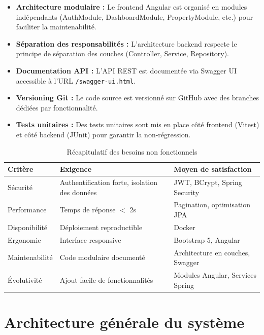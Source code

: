 \documentclass[a4paper,12pt]{report}
\begin{document}
\begin{itemize}
    \item \textbf{Architecture modulaire :} Le frontend Angular est organisé en modules indépendants (AuthModule, DashboardModule, PropertyModule, etc.) pour faciliter la maintenabilité.
    \item \textbf{Séparation des responsabilités :} L'architecture backend respecte le principe de séparation des couches (Controller, Service, Repository).
    \item \textbf{Documentation API :} L'API REST est documentée via Swagger UI accessible à l'URL \texttt{/swagger-ui.html}.
    \item \textbf{Versioning Git :} Le code source est versionné sur GitHub avec des branches dédiées par fonctionnalité.
    \item \textbf{Tests unitaires :} Des tests unitaires sont mis en place côté frontend (Vitest) et côté backend (JUnit) pour garantir la non-régression.
\end{itemize}

\begin{table}[H]
\centering
\begin{tabular}{|p{4cm}|p{5cm}|p{5cm}|}
\hline
\textbf{Critère} & \textbf{Exigence} & \textbf{Moyen de satisfaction} \\
\hline
Sécurité & Authentification forte, isolation des données & JWT, BCrypt, Spring Security \\
\hline
Performance & Temps de réponse $<$ 2s & Pagination, optimisation JPA \\
\hline
Disponibilité & Déploiement reproductible & Docker \\
\hline
Ergonomie & Interface responsive & Bootstrap 5, Angular \\
\hline
Maintenabilité & Code modulaire documenté & Architecture en couches, Swagger \\
\hline
Évolutivité & Ajout facile de fonctionnalités & Modules Angular, Services Spring \\
\hline
\end{tabular}
\caption{Récapitulatif des besoins non fonctionnels}
\end{table}


\section{Architecture générale du système}
\end{document}
